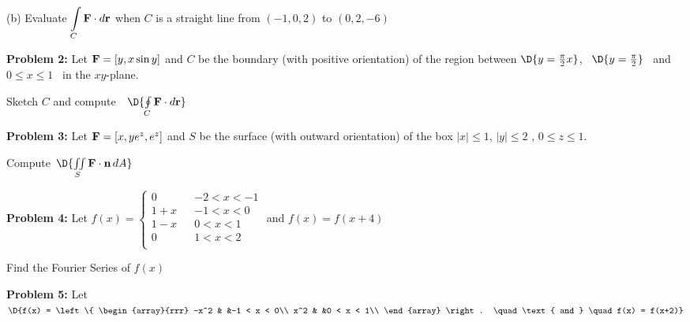 \documentclass[12pt]{amsart}
\numberwithin{equation}{section}
\begin{document}
\vspace{0.4cm}

(b) Evaluate $\displaystyle{\int \limits_{C} \text{\bf F} \cdot  d\text{\bf r}}$ when $C$ is a straight line from $(-1,0,2)$ to $(0,2,-6)$

\thispagestyle{empty}
\newpage
\thispagestyle{empty}

{\bf Problem 2:} Let $\text{\bf F} = [y,x\sin y]$ and $C$ be the boundary (with positive orientation) of the region between $\D{y=\frac{\pi}{2}x}$, \, $\D{y=\frac{\pi}{2}}$ \, and $0\le x \le 1$ \, in the $xy$-plane.

Sketch $C$ and compute \,\, $\D{\oint \limits_{C} \text{\bf F}\cdot d\text{\bf r}}$\\

\vspace{19.2cm}

\thispagestyle{empty}
\newpage
\thispagestyle{empty}

{\bf Problem 3:} Let $\text{\bf F} = [x,ye^z,e^z]$ and $S$ be the surface (with outward orientation) of the box $|x|\le 1$, $|y|\le 2$ , $0\le z \le 1$.

\vspace{0.2cm}

Compute \,$\D{\iint \limits_{S} \text{\bf F}\cdot \text{\bf n} \, dA}$

\vspace{0.2cm}

\thispagestyle{empty}
\newpage
\thispagestyle{empty}

{\bf Problem 4:} Let \quad
$
f(x) = 
\left\{
\begin{array}{lrc}
	0 & &-2  < x <  -1\\
	1+x & &-1  < x <   0\\
	1-x & &0  < x <   1\\
	0 & & 1  < x <   2\\
\end{array}
\right.
$  \quad and \quad $f(x) = f(x+4)$

\vspace{0.1cm}

Find the Fourier Series of $f(x)$ 

\thispagestyle{empty}
\newpage
\thispagestyle{empty}

{\bf Problem 5:} Let \quad 
$\D{f(x) = 
\left\{
\begin{array}{rrr}
	-x^2 & &-1  < x <   0\\
	x^2 & &0  < x <   1\\
\end{array}
\right.
\quad \text{ and } \quad f(x) = f(x+2)}$
\end{document}

